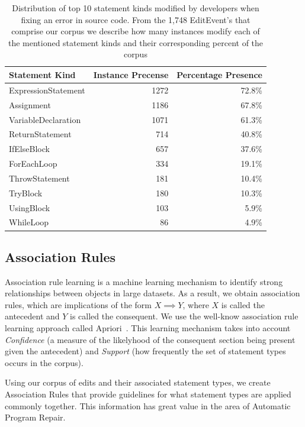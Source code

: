 \documentclass[sigconf]{acmart}
\begin{document}
\begin{table}[]
\centering
\caption{Distribution of top 10 statement kinds modified by 
developers when fixing an error in source code. From the 1,748 
EditEvent's that comprise our corpus we describe how many instances
modify each of the mentioned statement kinds and their corresponding
percent of the corpus}
\label{corpusDist}
\begin{tabular}{lrr}
\toprule
Statement Kind      & Instance Precense & Percentage Presence  \\
\midrule
ExpressionStatement & 1272 & 72.8\% \\
Assignment          & 1186 & 67.8\% \\
VariableDeclaration & 1071 & 61.3\% \\
ReturnStatement     & 714  & 40.8\% \\
IfElseBlock         & 657  & 37.6\% \\
ForEachLoop         & 334  & 19.1\% \\
ThrowStatement      & 181  & 10.4\% \\
TryBlock            & 180  & 10.3\% \\
UsingBlock          & 103  & 5.9\%  \\
WhileLoop           & 86   & 4.9\%  \\
\bottomrule
\end{tabular}
\end{table}


\subsection{Association Rules}
\label{assocRules}
Association rule learning is a machine learning mechanism to identify
strong relationships between objects in large datasets. 
As a result, we obtain association rules, which are implications of the
form $X \implies Y$, where $X$ is called the antecedent and 
$Y$ is called the consequent.
We use the well-know association rule learning approach called 
Apriori~\cite{Agrawal94}. This learning mechanism takes into 
account \textit{Confidence} (a measure of the likelyhood 
of the consequent section being present given the 
antecedent) and \textit{Support} (how frequently the set of
statement types occurs in the corpus).

Using our corpus of edits and their associated statement types, 
we create Association Rules that provide guidelines
for what statement types are applied commonly together. This
information has great value in the area of Automatic 
Program Repair.
\end{document}
